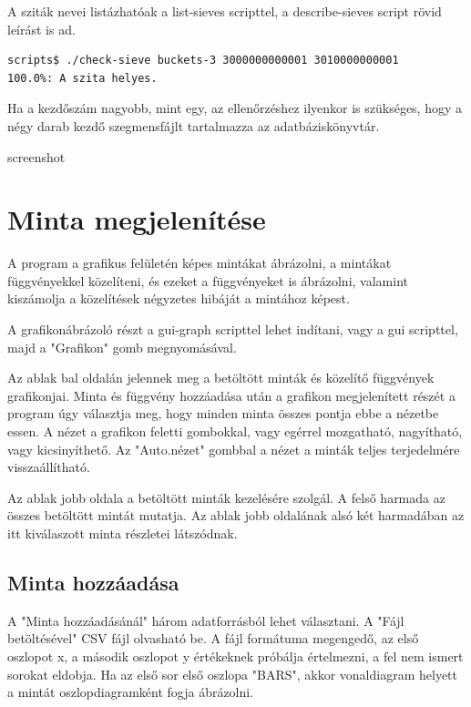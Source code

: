 \documentclass[12pt]{report}
\begin{document}
A sziták nevei listázhatóak a list-sieves scripttel, a describe-sieves script rövid leírást
is ad.

{\tiny
\begin{lstlisting}[language=bash]
scripts$ ./check-sieve buckets-3 3000000000001 3010000000001
100.0%: A szita helyes.
\end{lstlisting}
}

Ha a kezdőszám nagyobb, mint egy, az ellenőrzéshez ilyenkor is szükséges,
hogy a négy darab kezdő szegmensfájlt tartalmazza az adatbáziskönyvtár.

{\color{red}screenshot}

\section{Minta megjelenítése}

A program a grafikus felületén képes mintákat ábrázolni, a mintákat függvényekkel
közelíteni, és ezeket a függvényeket is ábrázolni, valamint kiszámolja a közelítések
négyzetes hibáját a mintához képest.

A grafikonábrázoló részt a gui-graph scripttel lehet indítani,
vagy a gui scripttel, majd a "Grafikon" gomb megnyomásával.

Az ablak bal oldalán jelennek meg a betöltött minták és közelítő függvények
grafikonjai. Minta és függvény hozzáadása után a grafikon megjelenített részét
a program úgy választja meg, hogy minden minta összes pontja ebbe a nézetbe essen.
A nézet a grafikon feletti gombokkal, vagy egérrel mozgatható, nagyítható, vagy
kicsinyíthető.
Az "Auto.nézet" gombbal a nézet a minták teljes terjedelmére visszaállítható.

Az ablak jobb oldala a betöltött minták kezelésére szolgál.
A felső harmada az összes betöltött mintát mutatja.
Az ablak jobb oldalának alsó két harmadában az itt kiválaszott minta részletei
látszódnak.

\subsection{Minta hozzáadása}

A "Minta hozzáadásánál" három adatforrásból lehet választani.
A "Fájl betöltésével" CSV fájl olvasható be. A fájl formátuma megengedő,
az első oszlopot x, a második oszlopot y értékeknek próbálja értelmezni,
a fel nem ismert sorokat eldobja. Ha az első sor első oszlopa "BARS",
akkor vonaldiagram helyett a mintát oszlopdiagramként fogja ábrázolni.
\end{document}

